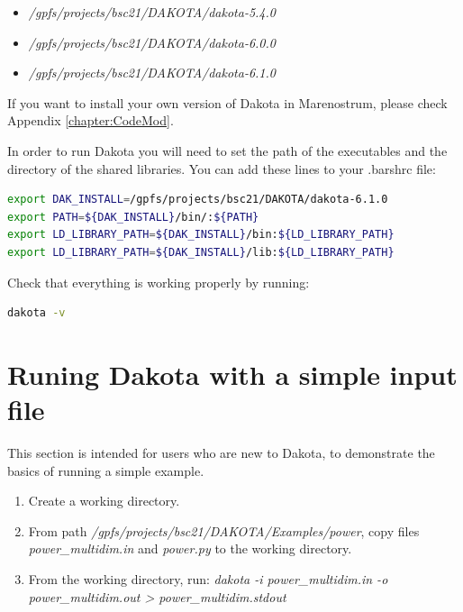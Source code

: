 \documentclass[12pt,a4paper,article]{memoir}
\begin{document}
\begin{itemize}
\item \textit{/gpfs/projects/bsc21/DAKOTA/dakota-5.4.0}
\item \textit{/gpfs/projects/bsc21/DAKOTA/dakota-6.0.0}
\item \textit{/gpfs/projects/bsc21/DAKOTA/dakota-6.1.0}
\end{itemize}

If you want to install your own version of Dakota in Marenostrum, please check Appendix \ref{chapter:CodeMod}.


In order to run Dakota you will need to set the path of the executables and the directory of the shared libraries. You can add these lines to your .barshrc file:

\begin{lstlisting}[style=MyCodeStyle,language=bash]
export DAK_INSTALL=/gpfs/projects/bsc21/DAKOTA/dakota-6.1.0
export PATH=${DAK_INSTALL}/bin/:${PATH}
export LD_LIBRARY_PATH=${DAK_INSTALL}/bin:${LD_LIBRARY_PATH}
export LD_LIBRARY_PATH=${DAK_INSTALL}/lib:${LD_LIBRARY_PATH}
\end{lstlisting}

Check that everything is working properly by running:

\begin{lstlisting}[style=MyCodeStyle,language=bash]
dakota -v
\end{lstlisting}

\section{Runing Dakota with a simple input file}
\label{section:RunDakota}

This section is intended for users who are new to Dakota, to demonstrate the basics of running a simple example.

\begin{enumerate}
\item Create a working directory.
\item From path \textit{/gpfs/projects/bsc21/DAKOTA/Examples/power}, copy files \textit{power\_multidim.in} and \textit{power.py} to the working directory.
\item From the working directory, run: \textit{dakota -i power\_multidim.in -o power\_multidim.out \textgreater{} power\_multidim.stdout}
\end{enumerate}
\end{document}
